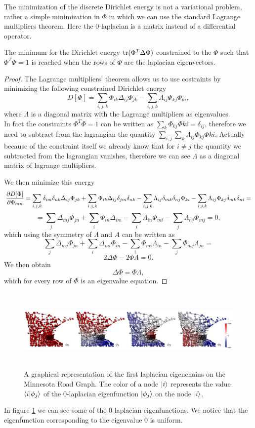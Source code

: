 \documentclass[../2.tex]{subfiles}
\begin{document}
The minimization of the discrete Dirichlet energy is not a variational problem, rather a simple minimization in $\Phi$ in which we can 
use the standard Lagrange multipliers theorem. Here the $0$-laplacian is a matrix instead of a differential operator. 
\begin{prop}
    The minimum for the Dirichlet energy $ \operatorname{tr}(\Phi^T \Delta \Phi)$ constrained to the $\Phi$ such that $\Phi^T \Phi = 1$ is reached when the
    rows of $\Phi$ are the laplacian eigenvectors.
\end{prop}
\begin{proof}
    The Lagrange multipliers' theorem allows us to use costraints by minimizing the following constrained Dirichlet energy
    \[ D[\Phi] = \sum_{i,j,k} \Phi_{ik} \Delta_{ij} \Phi_{jk} - \sum_{i,j,k} \Lambda_{ij} \Phi_{kj} \Phi_{ki}, \]
    where $\Lambda$ is a diagonal matrix with the Lagrange multipliers as eigenvalues.\\
    In fact the constraints $\Phi^T \Phi = 1$ can be written as $\sum_k \Phi_{kj} \Phi{ki} = \delta_{ij}$, therefore we need to subtract from the lagrangian
    the quantity $\sum_{i,j} \sum_k \Lambda_{ij} \Phi_{kj} \Phi{ki}$. Actually because of the constraint itself we already know that for $i \neq j$ the quantity
    we subtracted from the lagrangian vanishes, therefore we can see $\Lambda$ as a diagonal matrix of lagrange multipliers.  

    We then minimize this energy
    \[ \frac{\partial D[\Phi]}{\partial \Phi_{mn}} = \sum_{i,j,k} \delta_{im}\delta_{nk}\Delta_{ij} \Phi_{jk} + \sum_{i,j,k} \Phi_{ik} \Delta_{ij}\delta_{jm}\delta_{nk}
    - \sum_{i,j,k} \Lambda_{ij} \delta_{mk}\delta_{nj}\Phi_{ki} - \sum_{i,j,k} \Lambda_{ij} \Phi_{kj} \delta_{mk}\delta_{ni} =  \]
    \[ = \sum_{j} \Delta_{mj} \Phi_{jn} + \sum_{i} \Phi_{in} \Delta_{im} - \sum_{i} \Lambda_{in} \Phi_{mi} - \sum_{j} \Lambda_{nj} \Phi_{mj} = 0, \]
    which using the symmetry of $\Lambda$ and $A$ can be written as
    \[ \sum_{j} \Delta_{mj} \Phi_{jn} + \sum_{i}  \Delta_{mi} \Phi_{in} - \sum_{i} \Phi_{mi}\Lambda_{in} - \sum_{j} \Phi_{mj} \Lambda_{jn} =  \]
    \[ 2\Delta\Phi - 2\Phi\Lambda = 0. \]
    We then obtain 
    \[ \Delta\Phi = \Phi\Lambda, \]
    which for every row of $\Phi$ is an eigenvalue equation. \qedhere
\end{proof}

\begin{figure}[H]
    \centering
    \includegraphics[width=17cm, height=4cm]{sections/2/eiglap}
    \caption{A graphical representation of the first laplacian eigenchains on the Minnesota Road Graph.
    The color of a node $| i \rangle$ represents the value $\langle i | \phi_j \rangle$ of the $0$-laplacian eigenfunction $| \phi_j \rangle$
    on the node $| i \rangle$.}
    \label{fig:2:5}
\end{figure}

In figure \ref{fig:2:5} we can see some of the $0$-laplacian eigenfunctions. We notice that the eigenfunction corresponding to the eigenvalue $0$ is uniform.
   
\end{document}
